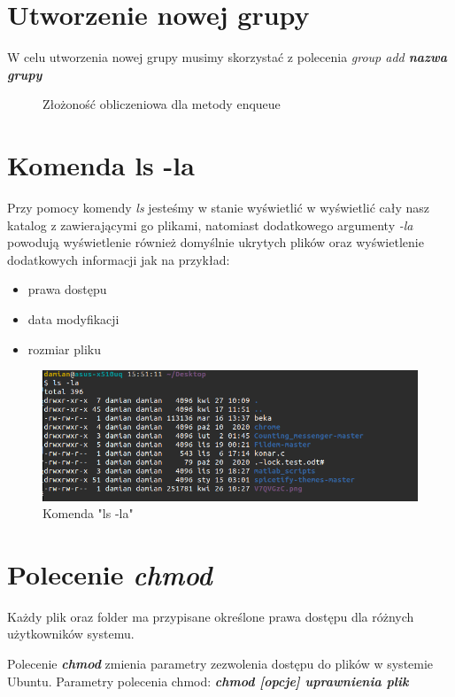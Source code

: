 \documentclass{article}
\begin{document}
\section{Utworzenie nowej grupy}
W celu utworzenia nowej grupy musimy skorzystać z polecenia \textit{group add \textbf{nazwa grupy}}

\begin{figure}[H]
    \centering
    \hspace*{-1cm}
    \caption{Złożoność obliczeniowa dla metody enqueue}
    \label{2}
\end{figure}


\section{Komenda ls -la}
Przy pomocy komendy \textit{ls} jesteśmy w stanie wyświetlić w wyświetlić
cały nasz katalog z zawierającymi go plikami, natomiast dodatkowego
argumenty \textit{-la} powodują wyświetlenie również domyślnie ukrytych
plików oraz wyświetlenie dodatkowych informacji jak na przykład: 
\begin{itemize}
    \item prawa dostępu
    \item data modyfikacji
    \item rozmiar pliku
\end{itemize}


\begin{figure}[H]
    \centering
    \hspace*{-1cm}
    \includegraphics[totalheight=4cm]{data/ls-la.png}
    \caption{Komenda "ls -la"}
    \label{2}
\end{figure}



\section{Polecenie \emph{\textbf{chmod}}}
Każdy plik oraz folder ma przypisane określone prawa dostępu dla różnych użytkowników systemu.\par
Polecenie \emph{\textbf{chmod}} zmienia parametry zezwolenia dostępu do plików w systemie Ubuntu.
Parametry polecenia chmod:
\emph{\textbf{chmod [opcje] uprawnienia plik}}\\
\end{document}
